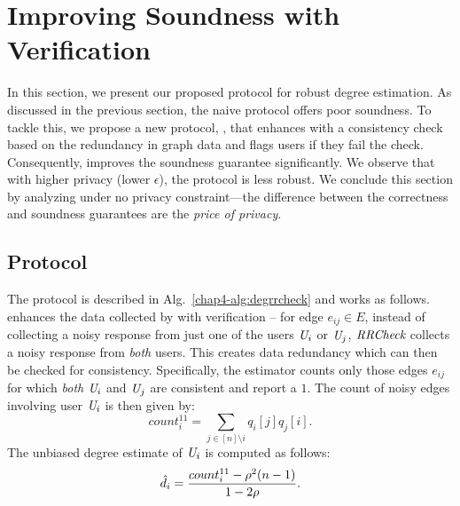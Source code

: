 
\section{Improving Soundness with Verification}\label{chap4-sec:robust-rr-checks}

In this section, we present our proposed protocol for robust degree estimation. 
As discussed in the previous section, the naive \DegRRNaive{} protocol offers poor soundness. To tackle
this, we propose a new protocol, \DegRRCheck, that enhances
\DegRRNaive{} with a consistency check based on the
redundancy in graph data and flags users if they fail the check. Consequently, \DegRRNaive{} improves the soundness guarantee significantly. We observe that with higher privacy (lower $\epsilon$), the protocol is less robust. We conclude this section by analyzing \DegRRCheck{} under no privacy constraint---the difference between the correctness and soundness guarantees are the \emph{price of privacy}.

  \vspace{-0.1cm}  \subsection{\DegRRCheck{} Protocol} \label{chap4-sec:protocol:check} 
The \DegRRCheck{} protocol is described in Alg.~\ref{chap4-alg:degrrcheck} and works as follows. \DegRRCheck{} enhances the data collected by \DegRRNaive{} with verification -- for edge $e_{ij} \in E$, instead of collecting a noisy response from just one of the users
$\textit{U}_i$ or $\textit{U}_j$, $\textit{RRCheck}{}$ collects a noisy response from \emph{both} users. This creates
data redundancy which can then be checked for consistency. Specifically, the estimator counts only those edges $e_{ij}$ for which \textit{both} $\textit{U}_i$ and $\textit{U}_j$ are consistent and report a $1$. 
 The count of noisy edges involving user $\textit{U}_i$ is then given by:
\[count_i^{11} = \sum_{j\in [n]\setminus i} q_{i}[j] q_{j}[i].\]
The unbiased degree estimate of $\textit{U}_i$ is computed as follows:
\begin{equation}\label{chap4-eq:deg-est}\vspace{-0.1cm}
    \hd_i = \frac{count_i^{11} - \rho^2(n-1)}{1-2\rho}.
\end{equation}


